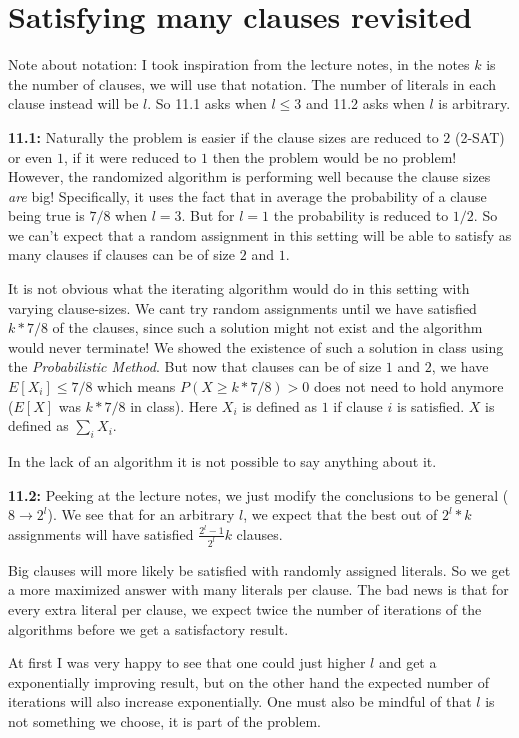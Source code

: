 \documentclass[a4paper,11pt]{article}
\begin{document}
\section{Satisfying many clauses revisited}

Note about notation: I took inspiration from the lecture notes,
in the notes
$k$ is the number of clauses, we will use that notation.
The number of literals in
each clause instead will be $l$. So 11.1 asks
when $l \leq 3$ and 11.2 asks when $l$ is arbitrary.

\textbf{11.1:} Naturally the problem is easier if the clause sizes
are reduced to $2$ (2-SAT) or even $1$, if it were reduced to $1$
then the problem would be no problem!
However, the randomized algorithm is performing well
because the clause sizes \emph{are} big! Specifically, it uses
the fact that in average the probability of a clause
being true is $7/8$ when $l=3$. But for $l=1$
the probability is reduced to $1/2$. So we
can't expect that a random assignment in this setting will
be able to satisfy as many clauses
if clauses can be of size $2$ and $1$.

It is not obvious what the iterating algorithm would do in this
setting with varying clause-sizes.
We cant try random assignments until we have satisfied $k*7/8$
of the clauses, since such a solution might not exist and the
algorithm would never terminate!
We showed the existence of such a solution in class using
the \emph{Probabilistic Method}. But now that clauses can be
of size $1$ and $2$, we have $E[X_i] \leq 7/8$ which
means $P(X \geq k*7/8) > 0$ does not need to hold anymore
($E[X]$ was $k*7/8$ in class).
Here $X_i$ is defined as $1$ if clause $i$ is satisfied.
$X$ is defined as $\sum_i X_i$.

In the lack of an algorithm it is not possible to say
anything about it.

\textbf{11.2:} Peeking at the lecture notes, we just modify the
conclusions to be general ($8 \to 2^l$). We see that
for an arbitrary $l$,
we expect that the best out of $2^l*k$ assignments will
have satisfied $\frac{2^l-1}{2^l}k$ clauses.

Big clauses will more likely be satisfied with
randomly assigned literals. So we get a more maximized
answer with many literals per clause. The bad news is
that for every extra literal per clause, we expect twice
the number of iterations of the algorithms before we get
a satisfactory result.

At first I was very happy to see that one could just
higher $l$ and get a exponentially improving result,
but on the other hand the expected number of iterations
will also increase exponentially. One must also
be mindful of that $l$ is not something we choose,
it is part of the problem.
\end{document}
